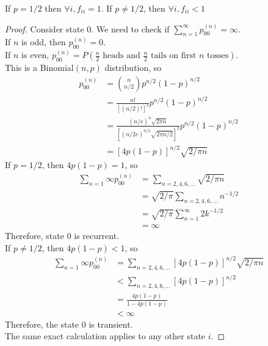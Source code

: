 \documentclass[11pt]{article}
\newcommand{\dur}[3]{{#1}_{#2}^{({#3})}}
\begin{document}
    If $p = 1/2$ then $\forall i, f_{ii} = 1$. If $p \neq 1/2$, then $\forall i, f_{ii} < 1$ 
    \begin{proof}
   	Consider state 0. We need to check if $\sum_{n=1}^\infty \dur{p}{00}{n} = \infty$. \\
   	If $n$ is odd, then $\dur{p}{00}{n} = 0$.\\
   	If $n$ is even, $\dur{p}{00}{n} = P(\frac{n}{2} \text{ heads and } \frac{n}{2} \text{ tails on first } n \text{ tosses})$.\\ This is a Binomial$(n,p)$ distribution, so
   	\begin{align*}
   		\dur{p}{00}{n} &= {n \choose n/2} p^{n/2}(1-p)^{n/2} \\
   					   &= \frac{n!}{[(n/2)!]^2}p^{n/2}(1-p)^{n/2} \\
   					   &= \frac{(n/e)^n\sqrt{2\pi n}}{[(n/2e)^{n/2}\sqrt{2\pi n/ 2}]^2}p^{n/2}(1-p)^{n/2} \tag{Sirling's approximation}\\
   					   &= [4p(1-p)]^{n/2}\sqrt{2/\pi n} 
   	\end{align*}
   	 If $p = 1/2$, then $4p(1-p) = 1$, so
   	\begin{align*}
   		\sum_{n=1}\infty \dur{p}{00}{n} &= \sum_{n=2,4,6,\hdots} \sqrt{2/\pi n} \\
   		&= \sqrt{2/\pi}\sum_{n=2,4,6,\hdots} n^{-1/2} \\
   		&= \sqrt{2/\pi}\sum_{n=1}^\infty 2k^{-1/2} \\
   		&= \infty
   	\end{align*} 
   	Therefore, state 0 is recurrent. \\
   	 If $p \neq 1/2$, then $4p(1-p) < 1$, so
   	\begin{align*}
   		\sum_{n=1}\infty \dur{p}{00}{n} &= \sum_{n=2,4,6,\hdots} [4p(1-p)]^{n/2}\sqrt{2/\pi n} \\
   		&< \sum_{n=2,4,6,\hdots} [4p(1-p)]^{n/2} \tag{Geometric Series} \\
   		&= \frac{4p(1-p)}{1-4p(1-p)} \\
   		&< \infty
   	\end{align*} 
   	Therefore, the state 0 is transient.\\
   	The same exact calculation applies to any other state $i$.
    \end{proof}
    
\end{document}
